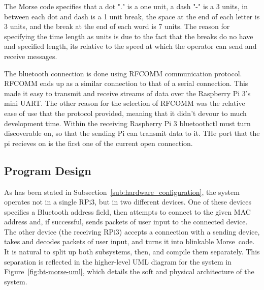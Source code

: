 \documentclass[11pt]{article}
\begin{document}
The Morse code specifies that a dot "." is a one unit, a dash "-" is a 3 units, in between each dot and dash is a 1 unit break, the space at the end of each letter is 3 units, and the break at the end of each word is 7 units.
The reason for specifying the time length as units is due to the fact that the breaks do no have and specified length, its relative to the speed at which the operator can send and receive messages.


The bluetooth connection is done using RFCOMM communication protocol.
RFCOMM ends up as a similar connection to that of a serial connection.
This made it easy to transmit and receive streams of data over the Raspberry Pi 3's mini UART.
The other reason for the selection of RFCOMM was the relative ease of use that the protocol provided, meaning that it didn't devour to much development time.
Within the receiving Raspberry Pi 3 bluetoothctl must turn discoverable on, so that the sending Pi can transmit data to it.
THe port that the pi recieves on is the first one of the current open connection.




\subsection{Program Design}
\label{sub:program_design}






As has been stated in Subsection~\ref{sub:hardware_configuration}, the system operates not in a single RPi3, but in two different devices.
One of these devices specifies a Bluetooth address field, then attempts to connect to the given MAC address and, if successful, sends packets of user input to the connected device.
The other device (the receiving RPi3) accepts a connection with a sending device, takes and decodes packets of user input, and turns it into blinkable Morse~code.
It is natural to split up both subsystems, then, and compile them separately.
This separation is reflected in the higher-level UML diagram for the system in Figure~\ref{fig:bt-morse-uml}, which details the soft and physical architecture of the system.
\end{document}
